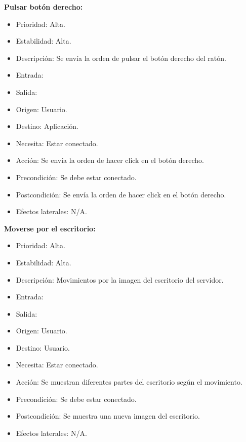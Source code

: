 \textbf{Pulsar botón derecho:}
\begin{itemize}
\item Prioridad: Alta.
\item Estabilidad: Alta.
\item Descripción: Se envía la orden de pulsar el botón derecho del ratón.
\item Entrada:
\item Salida:
\item Origen: Usuario.
\item Destino: Aplicación.
\item Necesita: Estar conectado.
\item Acción: Se envía la orden de hacer click en el botón derecho.
\item Precondición: Se debe estar conectado.
\item Postcondición: Se envía la orden de hacer click en el botón derecho.
\item Efectos laterales: N/A.\\

\end{itemize}

\textbf{Moverse por el escritorio:}
\begin{itemize}
\item Prioridad: Alta.
\item Estabilidad: Alta.
\item Descripción: Movimientos por la imagen del escritorio del servidor.
\item Entrada:
\item Salida:
\item Origen: Usuario.
\item Destino: Usuario.
\item Necesita: Estar conectado.
\item Acción: Se muestran diferentes partes del escritorio según el movimiento.
\item Precondición: Se debe estar conectado.
\item Postcondición: Se muestra una nueva imagen del escritorio.
\item Efectos laterales: N/A.\\

\end{itemize}

